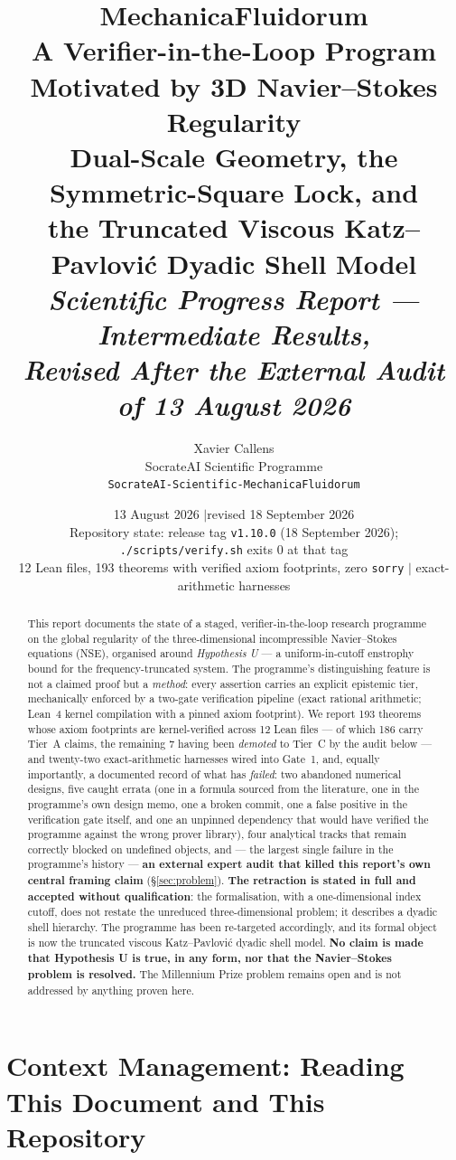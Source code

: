 \documentclass[11pt,a4paper]{article}
\title{\textbf{MechanicaFluidorum}\\[0.3em]
\large A Verifier-in-the-Loop Program Motivated by 3D Navier--Stokes Regularity\\[0.4em]
\normalsize Dual-Scale Geometry, the Symmetric-Square Lock, and\\
\normalsize the Truncated Viscous Katz--Pavlovi\'c Dyadic Shell Model\\[0.6em]
\normalsize\textit{Scientific Progress Report --- Intermediate Results,\\
Revised After the External Audit of 13 August 2026}}
\author{Xavier Callens\\
\small SocrateAI Scientific Programme\\
\small\texttt{SocrateAI-Scientific-MechanicaFluidorum}}
\date{13 August 2026 \quad$\vert$\quad revised 18 September 2026\\[0.3em]
\small Repository state: release tag \texttt{v1.10.0} (18 September 2026); \texttt{./scripts/verify.sh} exits 0 at that tag\\[0.2em]
\small 12 Lean files, 193 theorems with verified axiom footprints, zero \texttt{sorry} \quad$\vert$\quad 22 exact-arithmetic harnesses}
\theoremstyle{definition}
\theoremstyle{plain}
\begin{document}
\maketitle

\begin{abstract}
\noindent
This report documents the state of a staged, verifier-in-the-loop research programme on the
global regularity of the three-dimensional incompressible Navier--Stokes equations (NSE),
organised around \emph{Hypothesis U} --- a uniform-in-cutoff enstrophy bound for the
frequency-truncated system. The programme's distinguishing feature is not a claimed proof but
a \emph{method}: every assertion carries an explicit epistemic tier, mechanically enforced by
a two-gate verification pipeline (exact rational arithmetic; Lean~4 kernel compilation with a
pinned axiom footprint). We report 193 theorems whose axiom footprints are kernel-verified
across 12 Lean files --- of which 186 carry Tier~A claims, the remaining 7 having been
\emph{demoted} to Tier~C by the audit below --- and twenty-two exact-arithmetic harnesses
wired into Gate~1, and, equally importantly, a
documented record of what has \emph{failed}: two abandoned numerical designs, five caught
errata (one in a formula sourced from the literature, one in the programme's own design memo,
one a broken commit, one a false positive in the verification gate itself, and one an
unpinned dependency that would have verified the programme against the wrong prover library),
four analytical tracks that remain correctly blocked on undefined objects, and --- the largest
single failure in the programme's history --- \textbf{an external expert audit that killed this
report's own central framing claim} (\S\ref{sec:problem}).
\textbf{The retraction is stated in full and accepted without qualification}: the
formalisation, with a one-dimensional index cutoff, does not restate the unreduced
three-dimensional problem; it describes a dyadic shell hierarchy. The programme has been
re-targeted accordingly, and its formal object is now the truncated viscous Katz--Pavlovi\'c
dyadic shell model. \textbf{No claim is made that Hypothesis U is true, in any form, nor that
the Navier--Stokes problem is resolved.} The Millennium Prize problem remains open and is not
addressed by anything proven here.
\end{abstract}

\tableofcontents
\newpage

\section{Context Management: Reading This Document and This Repository}
\label{sec:context}
\end{document}
